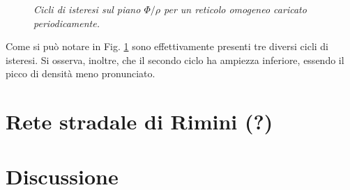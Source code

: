 \documentclass[../main.tex]{subfiles}
\begin{document}
\begin{figure}[H]
    \centering
    \caption[Isteresi per un reticolo omogeneo caricato periodicamente]{\emph{Cicli di isteresi sul piano $\Phi/\rho$ per un reticolo omogeneo caricato periodicamente.}}
    \label{fig:hysteresys_periodic_homo}
\end{figure}
Come si pu\`o notare in Fig. \ref{fig:hysteresys_periodic_homo} sono effettivamente presenti tre diversi cicli di isteresi.
Si osserva, inoltre, che il secondo ciclo ha ampiezza inferiore, essendo il picco di densit\`a meno pronunciato.

\section{Rete stradale di Rimini (?)}

\section{Discussione}


\end{document}

